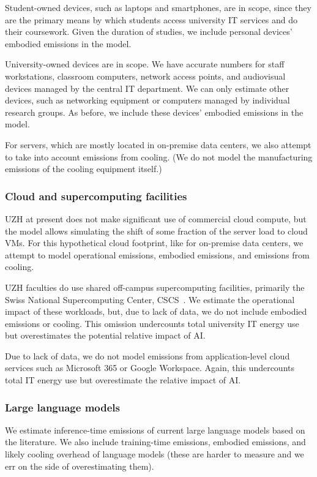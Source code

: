 \documentclass[11pt]{article}
\begin{document}
Student-owned devices, such as laptops and smartphones, are in scope, since they are the primary means by which students access university IT services and do their coursework. Given the duration of studies, we include personal devices' embodied emissions in the model.

University-owned devices are in scope. We have accurate numbers for staff workstations, classroom computers, network access points, and audiovisual devices managed by the central IT department. We can only estimate other devices, such as networking equipment or computers managed by individual research groups. As before, we include these devices' embodied emissions in the model.

For servers, which are mostly located in on-premise data centers, we also attempt to take into account emissions from cooling. (We do not model the manufacturing emissions of the cooling equipment itself.)

\subsubsection*{Cloud and supercomputing facilities}

UZH at present does not make significant use of commercial cloud compute, but the model allows simulating the shift of some fraction of the server load to cloud VMs. For this hypothetical cloud footprint, like for on-premise data centers, we attempt to model operational emissions, embodied emissions, and emissions from cooling.

UZH faculties do use shared off-campus supercomputing facilities, primarily the Swiss National Supercomputing Center, CSCS~\cite{cscs}. We estimate the operational impact of these workloads, but, due to lack of data, we do not include embodied emissions or cooling. This omission undercounts total university IT energy use but overestimates the potential relative impact of AI.

Due to lack of data, we do not model emissions from application-level cloud services such as Microsoft 365 or Google Workspace. Again, this undercounts total IT energy use but overestimate the relative impact of AI.

\subsubsection*{Large language models}

We estimate inference-time emissions of current large language models based on the literature. We also include training-time emissions, embodied emissions, and likely cooling overhead of language models (these are harder to measure and we err on the side of overestimating them).
\end{document}

